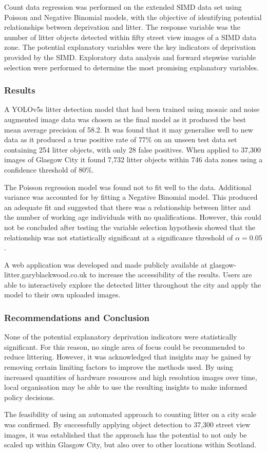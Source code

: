 \documentclass[10pt]{article}
\begin{document}
Count data regression was performed on the extended SIMD data set using Poisson and Negative Binomial models, with the objective of identifying potential relationships between deprivation and litter. The response variable was the number of litter objects detected within fifty street view images of a SIMD data zone. The potential explanatory variables were the key indicators of deprivation provided by the SIMD. Exploratory data analysis and forward stepwise variable selection were performed to determine the most promising explanatory variables.

\subsubsection*{Results}

A YOLOv5s litter detection model that had been trained using mosaic and noise augmented image data was chosen as the final model as it produced the best mean average precision of 58.2. It was found that it may generalise well to new data as it produced a true positive rate of 77\% on an unseen test data set containing 254 litter objects, with only 28 false positives. When applied to 37,300 images of Glasgow City it found 7,732 litter objects within 746 data zones using a confidence threshold of 80\%.

The Poisson regression model was found not to fit well to the data. Additional variance was accounted for by fitting a Negative Binomial model. This produced an adequate fit and suggested that there was a relationship between litter and the number of working age individuals with no qualifications. However, this could not be concluded after testing the variable selection hypothesis showed that the relationship was not statistically significant at a significance threshold of $\alpha = 0.05$.

A web application was developed and made publicly available at glasgow-litter.garyblackwood.co.uk to increase the accessibility of the results. Users are able to interactively explore the detected litter throughout the city and apply the model to their own uploaded images.

\subsubsection*{Recommendations and Conclusion}

None of the potential explanatory deprivation indicators were statistically significant. For this reason, no single area of focus could be recommended to reduce littering. However, it was acknowledged that insights may be gained by removing certain limiting factors to improve the methods used. By using increased quantities of hardware resources and high resolution images over time, local organisation may be able to use the resulting insights to make informed policy decisions.

The feasibility of using an automated approach to counting litter on a city scale was confirmed. By successfully applying object detection to 37,300 street view images, it was established that the approach has the potential to not only be scaled up within Glasgow City, but also over to other locations within Scotland.
    
\end{document}
